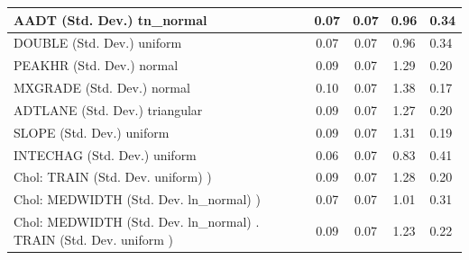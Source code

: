 \begin{table}
\begin{center}
\begin{tabular}{|l|l|c|c|c|l|}
			\hline
			AADT (Std. Dev.) tn_normal &  & 0.07 & 0.07 & 0.96 & 0.34 \\
			\hline
			DOUBLE (Std. Dev.) uniform &  & 0.07 & 0.07 & 0.96 & 0.34 \\
			\hline
			PEAKHR (Std. Dev.) normal &  & 0.09 & 0.07 & 1.29 & 0.20 \\
			\hline
			MXGRADE (Std. Dev.) normal &  & 0.10 & 0.07 & 1.38 & 0.17 \\
			\hline
			ADTLANE (Std. Dev.) triangular &  & 0.09 & 0.07 & 1.27 & 0.20 \\
			\hline
			SLOPE (Std. Dev.) uniform &  & 0.09 & 0.07 & 1.31 & 0.19 \\
			\hline
			INTECHAG (Std. Dev.) uniform &  & 0.06 & 0.07 & 0.83 & 0.41 \\
			\hline
			 Chol: TRAIN (Std. Dev. uniform) ) &  & 0.09 & 0.07 & 1.28 & 0.20 \\
			\hline
			 Chol: MEDWIDTH (Std. Dev. ln_normal) ) &  & 0.07 & 0.07 & 1.01 & 0.31 \\
			\hline
			 Chol: MEDWIDTH (Std. Dev. ln_normal) . TRAIN (Std. Dev.   uniform ) &  & 0.09 & 0.07 & 1.23 & 0.22 \\
			\hline
		\end{tabular}
	\end{center}
\end{table}